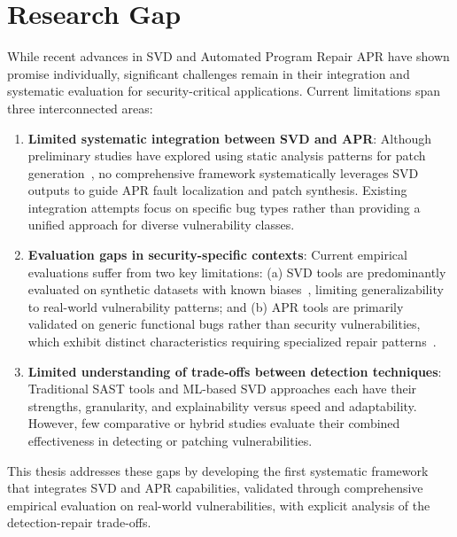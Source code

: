 \section{Research Gap} \label{sec:ae2}

While recent advances in SVD and Automated Program Repair APR have shown promise individually, significant challenges remain in their integration and systematic evaluation for security-critical applications. Current limitations span three interconnected areas:

\begin{enumerate}
    \item \textbf{Limited systematic integration between SVD and APR}: Although preliminary studies have explored using static analysis patterns for patch generation~\cite{Liu2018AVATARF,AlBataineh2021TowardsMR}, no comprehensive framework systematically leverages SVD outputs to guide APR fault localization and patch synthesis. Existing integration attempts focus on specific bug types rather than providing a unified approach for diverse vulnerability classes. 
    \item \textbf{Evaluation gaps in security-specific contexts}: Current empirical evaluations suffer from two key limitations: (a) SVD tools are predominantly evaluated on synthetic datasets with known biases~\cite{Guo2024DataQI}, limiting generalizability to real-world vulnerability patterns; and (b) APR tools are primarily validated on generic functional bugs rather than security vulnerabilities, which exhibit distinct characteristics requiring specialized repair patterns~\cite{apr4vul}.
    \item \textbf{Limited understanding of trade-offs between detection techniques}: Traditional SAST tools and ML-based SVD approaches each have their strengths, granularity, and explainability versus speed and adaptability. However, few comparative or hybrid studies evaluate their combined effectiveness in detecting or patching vulnerabilities.
\end{enumerate}

This thesis addresses these gaps by developing the first systematic framework that integrates SVD and APR capabilities, validated through comprehensive empirical evaluation on real-world vulnerabilities, with explicit analysis of the detection-repair trade-offs.
